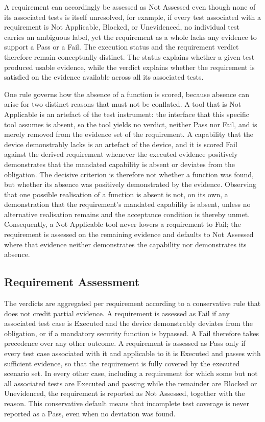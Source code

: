 A requirement can accordingly be assessed as Not Assessed even though none of its associated tests is itself unresolved, for example, if every test associated with a requirement is Not Applicable, Blocked, or Unevidenced, no individual test carries an ambiguous label, yet the requirement as a whole lacks any evidence to support a Pass or a Fail. The execution status and the requirement verdict therefore remain conceptually distinct. The status explains whether a given test produced usable evidence, while the verdict explains whether the requirement is satisfied on the evidence available across all its associated tests. 

One rule governs how the absence of a function is scored, because absence can arise for two distinct reasons that must not be conflated. A tool that is Not Applicable is an artefact of the test instrument: the interface that this specific tool assumes is absent, so the tool yields no verdict, neither Pass nor Fail, and is merely removed from the evidence set of the requirement. A capability that the device demonstrably lacks is an artefact of the device, and it is scored Fail against the derived requirement whenever the executed evidence positively demonstrates that the mandated capability is absent or deviates from the obligation. The decisive criterion is therefore not whether a function was found, but whether its absence was positively demonstrated by the evidence. Observing that one possible realisation of a function is absent is not, on its own, a demonstration that the requirement's mandated capability is absent, unless no alternative realisation remains and the acceptance condition is thereby unmet. Consequently, a Not Applicable tool never lowers a requirement to Fail; the requirement is assessed on the remaining evidence and defaults to Not Assessed where that evidence neither demonstrates the capability nor demonstrates its absence. 


\subsection{Requirement Assessment} 
\label{subsec:requirement_assessment} 

The verdicts are aggregated per requirement according to a conservative rule that does not credit partial evidence. A requirement is assessed as Fail if any associated test case is Executed and the device demonstrably deviates from the obligation, or if a mandatory security function is bypassed. A Fail therefore takes precedence over any other outcome. A requirement is assessed as Pass only if every test case associated with it and applicable to it is Executed and passes with sufficient evidence, so that the requirement is fully covered by the executed scenario set. In every other case, including a requirement for which some but not all associated tests are Executed and passing while the remainder are Blocked or Unevidenced, the requirement is reported as Not Assessed, together with the reason. This conservative default means that incomplete test coverage is never reported as a Pass, even when no deviation was found. 


